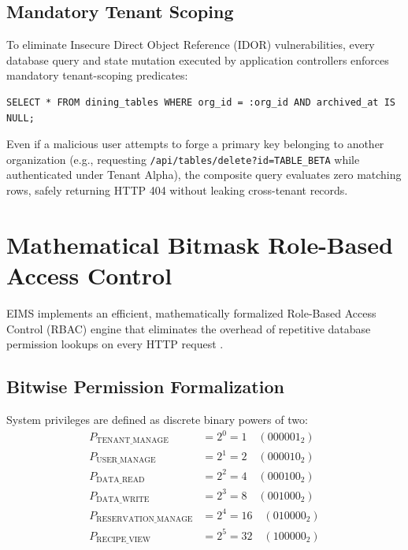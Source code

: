 \subsection{Mandatory Tenant Scoping}
To eliminate Insecure Direct Object Reference (IDOR) vulnerabilities, every database query and state mutation executed by application controllers enforces mandatory tenant-scoping predicates:
\begin{lstlisting}[language=SQLANSI]
SELECT * FROM dining_tables WHERE org_id = :org_id AND archived_at IS NULL;
\end{lstlisting}
Even if a malicious user attempts to forge a primary key belonging to another organization (e.g., requesting \texttt{/api/tables/delete?id=TABLE\_BETA} while authenticated under Tenant Alpha), the composite query evaluates zero matching rows, safely returning HTTP 404 without leaking cross-tenant records.

\section{Mathematical Bitmask Role-Based Access Control}
\label{sec:feat_rbac}
EIMS implements an efficient, mathematically formalized Role-Based Access Control (RBAC) engine that eliminates the overhead of repetitive database permission lookups on every HTTP request \parencite{sandhu1996role, sandhu2000nist}.

\subsection{Bitwise Permission Formalization}
System privileges are defined as discrete binary powers of two:
\begin{align}
    P_{\text{TENANT\_MANAGE}}      &= 2^0 = 1  \quad (\text{000001}_2) \\
    P_{\text{USER\_MANAGE}}        &= 2^1 = 2  \quad (\text{000010}_2) \\
    P_{\text{DATA\_READ}}          &= 2^2 = 4  \quad (\text{000100}_2) \\
    P_{\text{DATA\_WRITE}}         &= 2^3 = 8  \quad (\text{001000}_2) \\
    P_{\text{RESERVATION\_MANAGE}} &= 2^4 = 16 \quad (\text{010000}_2) \\
    P_{\text{RECIPE\_VIEW}}        &= 2^5 = 32 \quad (\text{100000}_2)
\end{align}

